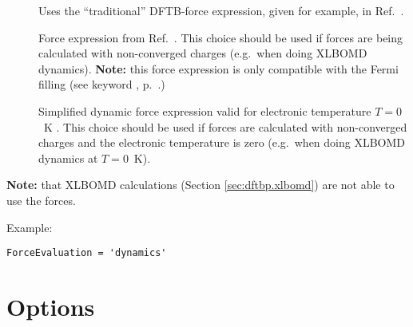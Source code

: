 \begin{description}
\begin{description}
\item[] Uses the ``traditional'' DFTB-force expression, given
  for example, in Ref.~\cite{elstner-prb-58-7260}.
\item[] Force expression from Ref.~\cite{aradi-jctc-11-3357}. This choice should be
  used if forces are being calculated with non-converged charges (e.g.\ when doing XLBOMD
  dynamics). \textbf{Note:} this force expression is only compatible with the Fermi filling (see
  keyword , p.~.)
\item [] Simplified dynamic force expression valid for
  electronic temperature \mbox{$T=0$~K} \cite{aradi-jctc-11-3357}.  This choice
  should be used if forces are calculated with non-converged charges and the
  electronic temperature is zero (e.g.\ when doing XLBOMD dynamics at
  \mbox{$T=0$~K}).
\end{description}

\textbf{Note:} that XLBOMD calculations (Section \ref{sec:dftbp.xlbomd}) are not able to use the
 forces.

Example:
\begin{verbatim}
ForceEvaluation = 'dynamics'
\end{verbatim}

\end{description}


\section{Options}
\label{sec:dftbp.Options}

